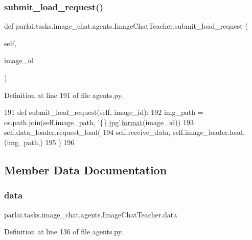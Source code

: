 \subsubsection{\texorpdfstring{submit\+\_\+load\+\_\+request()}{submit\_load\_request()}}
{\footnotesize\ttfamily def parlai.\+tasks.\+image\+\_\+chat.\+agents.\+Image\+Chat\+Teacher.\+submit\+\_\+load\+\_\+request (\begin{DoxyParamCaption}\item[{}]{self,  }\item[{}]{image\+\_\+id }\end{DoxyParamCaption})}



Definition at line 191 of file agents.\+py.


\begin{DoxyCode}
191     \textcolor{keyword}{def }submit\_load\_request(self, image\_id):
192         img\_path = os.path.join(self.image\_path, \textcolor{stringliteral}{'\{\}.jpg'}.\hyperlink{namespaceparlai_1_1chat__service_1_1services_1_1messenger_1_1shared__utils_a32e2e2022b824fbaf80c747160b52a76}{format}(image\_id))
193         self.data\_loader.request\_load(
194             self.receive\_data, self.image\_loader.load, (img\_path,)
195         )
196 
\end{DoxyCode}


\subsection{Member Data Documentation}
\mbox{\label{classparlai_1_1tasks_1_1image__chat_1_1agents_1_1ImageChatTeacher_a64d66688a29851c48e88f4c284ab57b6}} 
\subsubsection{\texorpdfstring{data}{data}}
{\footnotesize\ttfamily parlai.\+tasks.\+image\+\_\+chat.\+agents.\+Image\+Chat\+Teacher.\+data}



Definition at line 136 of file agents.\+py.

